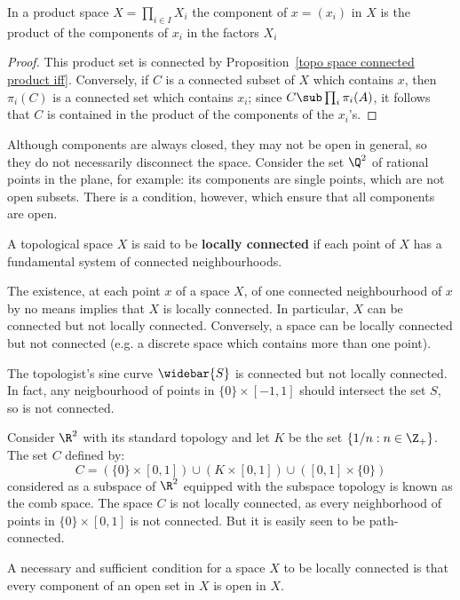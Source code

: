 \begin{proposition}\label{topo space component of product}
In a product space $X=\prod_{i\in I}X_i$ the component of $x=(x_i)$ in $X$ is the product of the components of $x_i$ in the factors $X_i$
\end{proposition}
\begin{proof}
This product set is connected by Proposition~\ref{topo space connected product iff}. Conversely, if $C$ is a connected subset of $X$ which contains $x$, then $\pi_i(C)$ is a connected set which contains $x_i$; since $C\sub\prod_i\pi_i(A)$, it follows that $C$ is contained in the product of the components of the $x_i$'s.
\end{proof}
Although components are always closed, they may not be open in general, so they do not necessarily disconnect the space. Consider the set $\Q^2$ of rational points in the plane, for example: its components are single points, which are not open subsets. There is a condition, however, which ensure that all components are open.
\begin{definition}
A topological space $X$ is said to be \textbf{locally connected} if each point of $X$ has a fundamental system of connected neighbourhoods.
\end{definition}
The existence, at each point $x$ of a space $X$, of one connected neighbourhood of $x$ by no means implies that $X$ is locally connected. In particular, $X$ can be connected but not locally connected. Conversely, a space can be locally connected but not connected (e.g. a discrete space which contains more than one point).
\begin{example}
The topologist's sine curve $\widebar{S}$ is connected but not locally connected. In fact, any neigbourhood of points in $\{0\}\times[-1,1]$ should intersect the set $S$, so is not connected.
\end{example}
\begin{example}
Consider $\R^2$ with its standard topology and let $K$ be the set $\{1/n:n\in\Z_+\}$. The set $C$ defined by:
\[C=(\{0\}\times[0,1])\cup(K\times[0,1])\cup([0,1]\times\{0\})\]
considered as a subspace of $\R^2$ equipped with the subspace topology is known as the comb space. The space $C$ is not locally connected, as every neighborhood of points in $\{0\}\times[0,1]$ is not connected. But it is easily seen to be path-connected.
\end{example}
\begin{proposition}\label{topo space locally connected iff compoenent open}
A necessary and sufficient condition for a space $X$ to be locally connected is that every component of an open set in $X$ is open in $X$.
\end{proposition}
